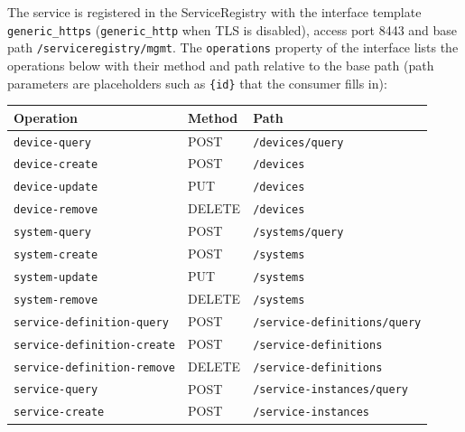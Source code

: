 \documentclass[a4paper]{arrowhead}
\begin{document}
The service is registered in the ServiceRegistry with the interface template \texttt{generic\_\allowbreak{}https} (\texttt{generic\_\allowbreak{}http} when TLS is disabled), access port 8443 and base path \texttt{/\allowbreak{}serviceregistry/\allowbreak{}mgmt}. The \texttt{operations} property of the interface lists the operations below with their method and path relative to the base path (path parameters are placeholders such as \texttt{\{id\}} that the consumer fills in):

\noindent\begin{longtable}{| p{5.2cm} | p{1.6cm} | p{8.4cm} |} \hline
\rowcolor{gray!33} Operation & Method & Path \\ \hline \endhead
\texttt{device-\allowbreak{}query} & POST & \texttt{/\allowbreak{}devices/\allowbreak{}query} \\ \hline
\texttt{device-\allowbreak{}create} & POST & \texttt{/\allowbreak{}devices} \\ \hline
\texttt{device-\allowbreak{}update} & PUT & \texttt{/\allowbreak{}devices} \\ \hline
\texttt{device-\allowbreak{}remove} & DELETE & \texttt{/\allowbreak{}devices} \\ \hline
\texttt{system-\allowbreak{}query} & POST & \texttt{/\allowbreak{}systems/\allowbreak{}query} \\ \hline
\texttt{system-\allowbreak{}create} & POST & \texttt{/\allowbreak{}systems} \\ \hline
\texttt{system-\allowbreak{}update} & PUT & \texttt{/\allowbreak{}systems} \\ \hline
\texttt{system-\allowbreak{}remove} & DELETE & \texttt{/\allowbreak{}systems} \\ \hline
\texttt{service-\allowbreak{}definition-\allowbreak{}query} & POST & \texttt{/\allowbreak{}service-\allowbreak{}definitions/\allowbreak{}query} \\ \hline
\texttt{service-\allowbreak{}definition-\allowbreak{}create} & POST & \texttt{/\allowbreak{}service-\allowbreak{}definitions} \\ \hline
\texttt{service-\allowbreak{}definition-\allowbreak{}remove} & DELETE & \texttt{/\allowbreak{}service-\allowbreak{}definitions} \\ \hline
\texttt{service-\allowbreak{}query} & POST & \texttt{/\allowbreak{}service-\allowbreak{}instances/\allowbreak{}query} \\ \hline
\texttt{service-\allowbreak{}create} & POST & \texttt{/\allowbreak{}service-\allowbreak{}instances} \\ \hline

\end{longtable}
\end{document}
